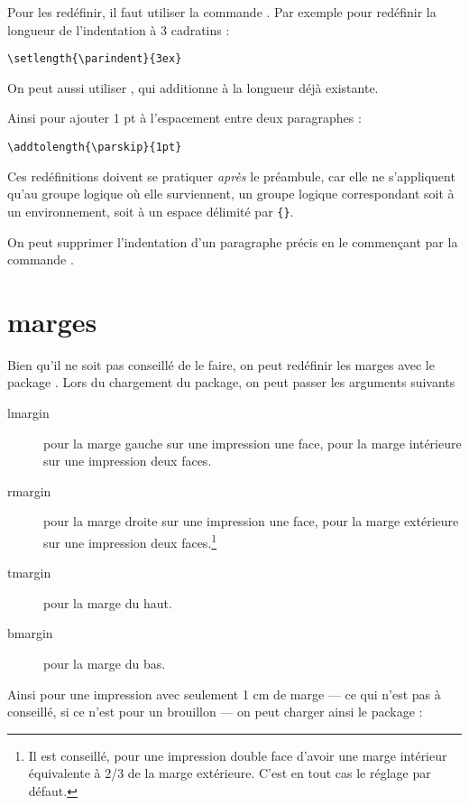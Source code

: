 Pour les redéfinir, il faut utiliser la commande . Par exemple pour redéfinir la longueur de l'indentation à 3 cadratins :
\begin{verbatim}
\setlength{\parindent}{3ex}
\end{verbatim}

On peut aussi utiliser , qui additionne  à la longueur déjà existante.

Ainsi pour ajouter 1 pt à l'espacement entre deux paragraphes :

\begin{verbatim}
\addtolength{\parskip}{1pt}
\end{verbatim}

Ces redéfinitions doivent se pratiquer \emph{après} le préambule, car elle ne s'appliquent qu'au groupe logique où elle surviennent, un groupe logique correspondant soit à un environnement, soit à un espace délimité par \verb|{}|.

\begin{plusloins}
On peut supprimer l'indentation d'un paragraphe précis en le commençant par la commande .
\end{plusloins}
\section{marges}

Bien qu'il ne soit pas conseillé de le faire, on peut redéfinir les marges avec le package . Lors du chargement du package, on peut passer les arguments suivants
\begin{description}
\item[lmargin]pour la marge gauche sur une impression une face, pour la marge intérieure sur une impression deux faces.
\item[rmargin]pour la marge droite sur une impression une face, pour la marge extérieure sur une impression deux faces.\footnote{Il est conseillé, pour une impression double face d'avoir une marge intérieur équivalente à 2/3 de la marge extérieure. C'est en tout cas le réglage par défaut.}
\item[tmargin]pour la marge du haut.
\item[bmargin]pour la marge du bas.
\end{description}

Ainsi pour une impression avec seulement 1 cm de marge --- ce qui n'est pas à conseillé, si ce n'est pour un brouillon --- on peut charger ainsi le package :

